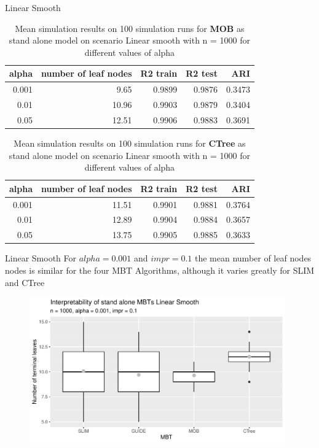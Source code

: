 \documentclass[9pt, xcolor=table]{beamer}
\begin{document}
\begin{frame}{Linear Smooth}
\begin{table}

\caption{Mean simulation results on 100 simulation runs for \textbf{MOB} as stand alone model on scenario Linear smooth with n = 1000 for different values of alpha}
\centering 
\begin{tabular}[t]{r|r|r|r|r}
\hline
alpha & number of leaf nodes & R2 train & R2 test & ARI\\
\hline
0.001 & 9.65 & 0.9899 & 0.9876 & 0.3473\\
\hline
0.01 & 10.96 & 0.9903 & 0.9879 & 0.3404\\
\hline
0.05 & 12.51 & 0.9906 & 0.9883 & 0.3691\\
\hline
\end{tabular}
\end{table} 


\begin{table}

\caption{Mean simulation results on 100 simulation runs for \textbf{CTree} as stand alone model on scenario Linear smooth with n = 1000 for different values of alpha}
\centering 
\begin{tabular}[t]{r|r|r|r|r}
\hline
alpha & number of leaf nodes & R2 train & R2 test & ARI\\
\hline
0.001 & 11.51 & 0.9901 & 0.9881 & 0.3764\\
\hline
0.01 & 12.89 & 0.9904 & 0.9884 & 0.3657\\
\hline
0.05 & 13.75 & 0.9905 & 0.9885 & 0.3633\\
\hline
\end{tabular}
\end{table}
\end{frame}



\begin{frame}{Linear Smooth}
For  $alpha= 0.001$ and $impr = 0.1$ the mean number of leaf nodes nodes is similar for the four MBT Algorithms, although it varies greatly for SLIM and CTree
\begin{figure}
    \includegraphics[width=11cm]{Figures/simulations/batchtools/basic_scenarios/linear_smooth/ls_1000_standalone_int.pdf}
\end{figure}   

    
\end{frame}
\end{document}
